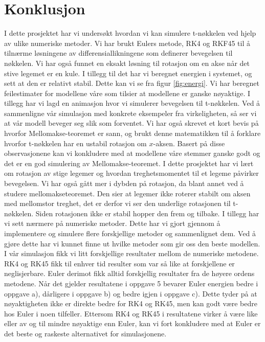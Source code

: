 \section{Konklusjon}
I dette prosjektet har vi undersøkt hvordan vi kan simulere t-nøkkelen ved hjelp av ulike numeriske metoder. Vi har brukt Eulers metode, RK4 og RKF45 til å tilnærme løsningene av differensiallikningene som definerer bevegelsen til nøkkelen. Vi har også funnet en eksakt løsning til rotasjon om en akse når det stive legemet er en kule. I tillegg til det har vi beregnet energien i systemet, og sett at den er relativt stabil. Dette kan vi se fra figur \ref{fig:energi}.\newline\newline
Vi har beregnet feilestimater for modellene våre som tilsier at modellene er ganske nøyaktige. I tillegg har vi lagd en animasjon hvor vi simulerer bevegelsen til t-nøkkelen. Ved å sammenligne vår simulasjon med konkrete eksempeler fra virkeligheten, så ser vi at vår modell beveger seg slik som forventet. Vi har også skrevet et kort bevis på hvorfor Mellomakse-teoremet er sann, og brukt denne matematikken til å forklare hvorfor t-nøkkelen har en ustabil rotasjon om $x$-aksen. Basert på disse observasjonene kan vi konkludere med at modellene våre stemmer ganske godt og det er en god simulering av Mellomakse-teoremet.\newline\newline
I dette prosjektet har vi lært om rotasjon av stige legemer og hvordan treghetsmomentet til et legeme påvirker bevegelsen. Vi har også gått mer i dybden på rotasjon, da blant annet ved å studere mellomakseteoremet. Den sier at legemer ikke roterer stabilt om aksen med mellomstor treghet, det er derfor vi ser den underlige rotasjonen til t-nøkkelen. Siden rotasjonen ikke er stabil hopper den frem og tilbake.\newline\newline
I tillegg har vi sett nærmere på numeriske metoder. Dette har vi gjort gjennom å implementere og simulere flere forskjellige metoder og sammenlignet dem. Ved å gjøre dette har vi kunnet finne ut hvilke metoder som gir oss den beste modellen. I vår simulasjon fikk vi litt forskjellige resultater mellom de numeriske metodene. RK4 og RK45 fikk til enhver tid resulter som var så like at forskjellene er neglisjerbare. Euler derimot fikk alltid forskjellig resultater fra de høyere ordens metodene. Når det gjelder resultatene i oppgave 5 bevarer Euler energien bedre i oppgave a), dårligere i oppgave b) og bedre igjen i oppgave c). Dette tyder på at nøyaktigheten ikke er direkte bedre for RK4 og RK45, men kan godt være bedre hos Euler i noen tilfeller. Ettersom RK4 og RK45 i resultatene virker å være like eller av og til mindre nøyaktige enn Euler, kan vi fort konkludere med at Euler er det beste og raskeste alternativet for simulasjonene.\newline\newline